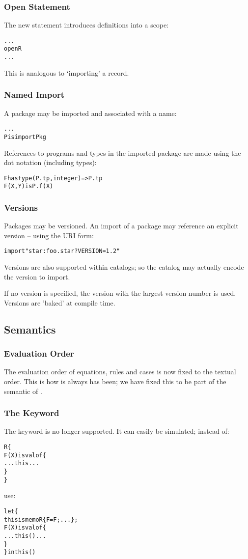 \subsubsection{Open Statement}
The new  statement introduces definitions into a scope:
\begin{alltt}
...
open R
...
\end{alltt}
This is analogous to `importing' a record.

\subsubsection{Named Import}
A package may be imported and associated with a name:
\begin{alltt}
...
P is import Pkg
\end{alltt}
References to programs and types in the imported package are made using the dot notation (including types):
\begin{alltt}
F has type (P.tp,integer)=>P.tp
F(X,Y) is P.f(X)
\end{alltt}

\subsubsection{Versions}
Packages may be versioned. An import of a package may reference an explicit version -- using the URI form:
\begin{alltt}
import "star:foo.star?VERSION=1.2"
\end{alltt}
Versions are also supported within catalogs; so the catalog may actually encode the version to import.

If no version is specified, the version with the largest version number is used. Versions are 'baked' at compile time.

\subsection{Semantics}
\subsubsection{Evaluation Order}
The evaluation order of equations, rules and cases is now fixed to the textual order. This is how is always has been; we have fixed this to be part of the semantic of \Sr.

\subsubsection{The  Keyword}
The  keyword is no longer supported. It can easily be simulated; instead of:
\begin{alltt}
R\{
  F(X) is valof\{
    ... this ...
  \}
\}
\end{alltt}
use:
\begin{alltt}
let\{
  this is memo R\{F=F;...\};
  F(X) is valof\{
    ... this() ...
  \}
\} in this()
\end{alltt}

